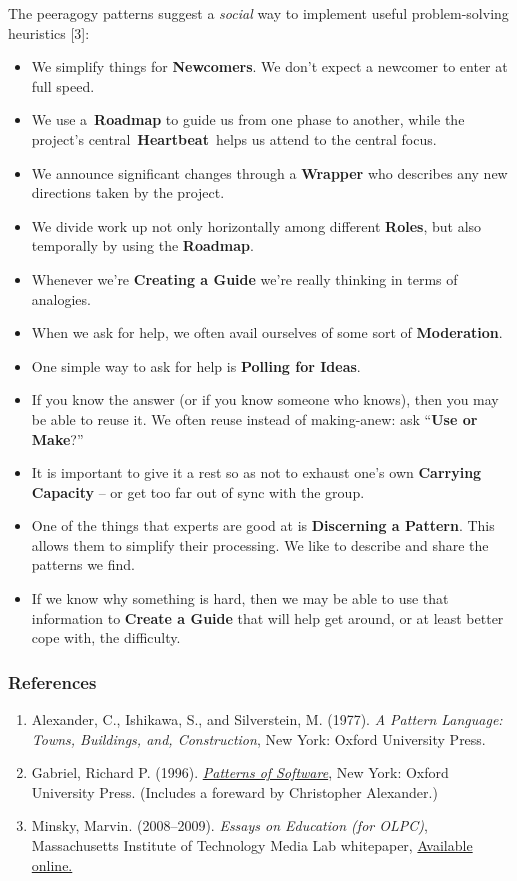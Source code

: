 \noindent The peeragogy patterns suggest a \emph{social} way to implement useful problem-solving heuristics [3]:

\begin{itemize}
\itemsep1pt\parskip0pt
\item
  We simplify things for \textbf{Newcomers}. We don't expect a newcomer to
  enter at full speed.
\item
  We use a~\textbf{Roadmap} to guide us from one phase to another, while
  the project's central~\textbf{Heartbeat}~helps us attend to the
  central focus.
\item
  We announce significant changes through a \textbf{Wrapper} who
  describes any new directions taken by the project.
\item
  We divide work up not only horizontally among different
  \textbf{Roles}, but also temporally by using the \textbf{Roadmap}.
\item
  Whenever we're \textbf{Creating a Guide}
  we're really thinking in terms of analogies.
\item
  When we ask for help, we often avail ourselves of some sort of
  \textbf{Moderation}.
\item One simple way to ask for help is \textbf{Polling for Ideas}.
\item
  If you know the answer (or if you know someone who knows), then you may be able to reuse it.  We often reuse instead of making-anew: ask ``\textbf{Use or Make}?''
\item
  It is important to give it a rest so as not to exhaust one's own
  \textbf{Carrying Capacity} -- or get too far out of sync with the
  group.
\item One of the things that experts are good at is \textbf{Discerning
  a Pattern}. This allows them to simplify their processing.  We like to describe and share the patterns we find.
\item If we know why something is hard, then we may be able to use
  that information to \textbf{Create a Guide} that will help get
  around, or at least better cope with, the difficulty.
\end{itemize}

\subsubsection{References}

\begin{enumerate}
\itemsep1pt\parskip0pt
\item
  Alexander, C., Ishikawa, S., and Silverstein, M. (1977). \emph{A
  Pattern Language: Towns, Buildings, and, Construction}, New York:
  Oxford University Press.
\item
  Gabriel, Richard P. (1996).
  \emph{\href{http://dreamsongs.net/Files/PatternsOfSoftware.pdf}{Patterns
  of Software}}, New York: Oxford University Press. (Includes a foreward
  by Christopher Alexander.)

\item Minsky, Marvin. (2008--2009). \emph{Essays on Education (for {O}{L}{P}{C})}, Massachusetts Institute of Technology Media Lab whitepaper, \href{http://web.media.mit.edu/~minsky/OLPC-1.html}{Available online.}
\end{enumerate}
